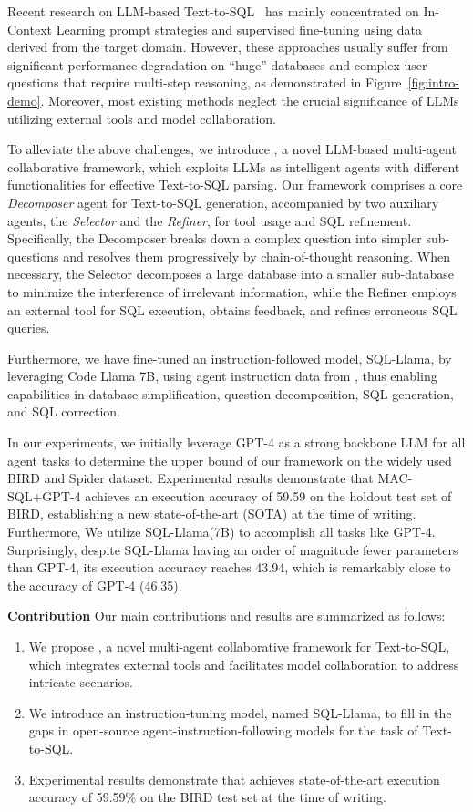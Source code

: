 Recent research on LLM-based Text-to-SQL~\citep{dong2023c3,pourreza2023dinsql,gao2023texttosql} has mainly concentrated on In-Context Learning prompt strategies and supervised fine-tuning using data derived from the target domain. 
However, these approaches usually suffer from significant performance degradation on “huge” databases and complex user questions that require multi-step reasoning, as demonstrated in Figure~\ref{fig:intro-demo}. 
Moreover, most existing methods neglect the crucial significance of LLMs utilizing external tools and model collaboration.

To alleviate the above challenges, we introduce \ours{}, a novel LLM-based multi-agent collaborative framework, which exploits LLMs as intelligent agents with different functionalities for effective Text-to-SQL parsing. 
Our framework comprises a core \textit{Decomposer} agent for Text-to-SQL generation, accompanied by two auxiliary agents, the \textit{Selector} and the \textit{Refiner}, for tool usage and SQL refinement.
Specifically, the Decomposer breaks down a complex question into simpler sub-questions and resolves them progressively by chain-of-thought reasoning.
When necessary, the Selector decomposes a large database into a smaller sub-database to minimize the interference of irrelevant information, while the Refiner employs an external tool for SQL execution, obtains feedback, and refines erroneous SQL queries.

Furthermore, we have fine-tuned an instruction-followed model, SQL-Llama, by leveraging Code Llama 7B, using agent instruction data from \ours{}, thus enabling capabilities in database simplification, question decomposition, SQL generation, and SQL correction. 

In our experiments, we initially leverage GPT-4 as a strong backbone LLM for all agent tasks to determine the upper bound of our \ours{} framework on the widely used BIRD and Spider dataset.
Experimental results demonstrate that MAC-SQL+GPT-4 achieves an execution accuracy of 59.59 on the holdout test set of BIRD, establishing a new state-of-the-art (SOTA) at the time of writing.
Furthermore, We utilize SQL-Llama(7B) to accomplish all tasks like GPT-4.
Surprisingly, despite SQL-Llama having an order of magnitude fewer parameters than GPT-4, its execution accuracy reaches 43.94, which is remarkably close to the accuracy of GPT-4 (46.35).

\textbf{Contribution} Our main contributions and results are summarized as follows:
\begin{enumerate}
    \item We propose \ours{}, a novel multi-agent collaborative framework for Text-to-SQL, which integrates external tools and facilitates model collaboration to address intricate scenarios.
    \item We introduce an instruction-tuning model, named SQL-Llama, to fill in the gaps in open-source agent-instruction-following models for the task of Text-to-SQL.
    \item Experimental results demonstrate that \ours{} achieves state-of-the-art execution accuracy of 59.59\% on the BIRD test set at the time of writing.
\end{enumerate}

